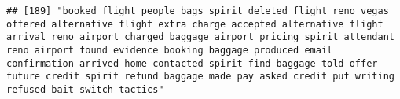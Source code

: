 \documentclass[
]{article}
\begin{document}
\begin{verbatim}
## [189] "booked flight people bags spirit deleted flight reno vegas offered alternative flight extra charge accepted alternative flight arrival reno airport charged baggage airport pricing spirit attendant reno airport found evidence booking baggage produced email confirmation arrived home contacted spirit find baggage told offer future credit spirit refund baggage made pay asked credit put writing refused bait switch tactics"                                                                                                                                                                                                                                                                                                                                                                                                                                                                                                                                                                                                                                                                                                                                                                                                                                                                                                                                                                                                                                                                                                                                                                                                                                                                                                                                                          

\end{verbatim}
\end{document}
